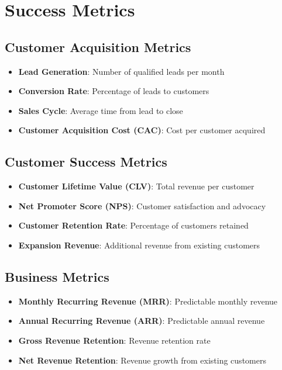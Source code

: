 \documentclass[business]{../templates/infraradar-main}
\begin{document}
\section{Success Metrics}

\subsection{Customer Acquisition Metrics}
\begin{itemize}
    \item \textbf{Lead Generation}: Number of qualified leads per month
    \item \textbf{Conversion Rate}: Percentage of leads to customers
    \item \textbf{Sales Cycle}: Average time from lead to close
    \item \textbf{Customer Acquisition Cost (CAC)}: Cost per customer acquired
\end{itemize}

\subsection{Customer Success Metrics}
\begin{itemize}
    \item \textbf{Customer Lifetime Value (CLV)}: Total revenue per customer
    \item \textbf{Net Promoter Score (NPS)}: Customer satisfaction and advocacy
    \item \textbf{Customer Retention Rate}: Percentage of customers retained
    \item \textbf{Expansion Revenue}: Additional revenue from existing customers
\end{itemize}

\subsection{Business Metrics}
\begin{itemize}
    \item \textbf{Monthly Recurring Revenue (MRR)}: Predictable monthly revenue
    \item \textbf{Annual Recurring Revenue (ARR)}: Predictable annual revenue
    \item \textbf{Gross Revenue Retention}: Revenue retention rate
    \item \textbf{Net Revenue Retention}: Revenue growth from existing customers
\end{itemize}
\end{document}
